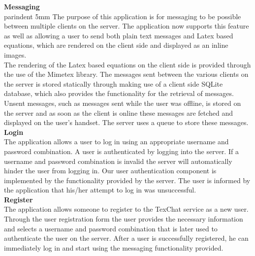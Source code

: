 \documentclass[29pt,a4paper]{moderncv}
\begin{document}
			
			\noindent\textbf{Messaging}
			\\parindent 5mm The purpose of this application is for messaging to be possible between multiple clients on the server. The application now supports this feature as well as allowing a user to send both plain text messages and Latex based equations, which are rendered on the client side and displayed as an inline images.\\
			The rendering of the Latex based equations on the client side is provided through the use of the Mimetex library. The messages sent between the various clients on the server is stored statically through making use of a client side SQLite database, which also provides the functionality for the retrieval of messages.
			\\Unsent messages, such as messages sent while the user was offline, is stored on the server and as soon as the client is online these messages are fetched and displayed on the user's handset. The server uses a queue to store these messages.\\
			
			\noindent\textbf{Login}
			\\The application allows a user to log in using an appropriate username and password combination. A user is authenticated by logging into the server.  If a username and password combination is invalid the server will automatically hinder the user from logging in. Our user authentication component is implemented by the functionality provided by the server. The user is informed by the application that his/her attempt to log in was unsuccessful.\\
			
			\noindent\textbf{Register}
			\\The application allows someone to register to the TexChat service as a new user. Through the user registration form the user provides the necessary information and selects a username and password combination that is later used to authenticate the user on the server. After a user is successfully registered, he can immediately log in and start using the messaging functionality provided.
			
		
\newpage
\end{document}

